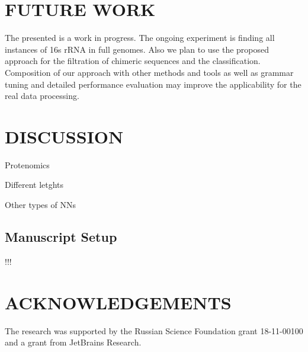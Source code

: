 \documentclass[a4paper,twoside]{article}
\begin{document}
\section{\uppercase{Future Work}}
\label{sec:FutureWork}

\noindent The presented is a work in progress. 
The ongoing experiment is finding all instances of 16s rRNA in full genomes.
Also we plan to use the proposed approach for the filtration of chimeric sequences and the classification.
Composition of our approach with other methods and tools as well as grammar tuning and detailed performance evaluation may improve the applicability for the real data processing.


\section{\uppercase{Discussion}}
\label{sec:Discussion}

Protenomics

Different letghts

Other types of NNs


\subsection{Manuscript Setup}

\noindent !!!

\section*{\uppercase{Acknowledgements}}

\noindent The research was supported by the Russian Science Foundation grant 18-11-00100 and a grant from JetBrains Research.


\vfill

{\small
}


\vfill
\end{document}
